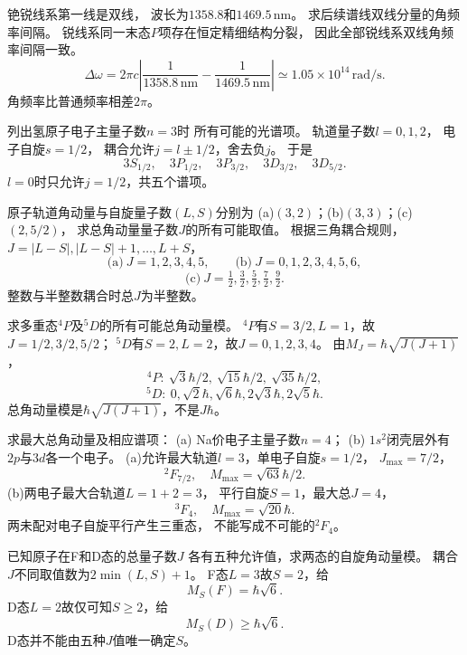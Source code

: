 铯锐线系第一线是双线，
波长为$1358.8$和$1469.5\,\mathrm{nm}$。
求后续谱线双线分量的角频率间隔。
\exsolution
锐线系同一末态$P$项存在恒定精细结构分裂，
因此全部锐线系双线角频率间隔一致。
\[
 \boxed{\Delta\omega=
 2\pi c\left|\frac1{1358.8\,\mathrm{nm}}
 -\frac1{1469.5\,\mathrm{nm}}\right|
 \simeq1.05\times10^{14}\,\mathrm{rad/s}}.
\]
\excheck 角频率比普通频率相差$2\pi$。

列出氢原子电子主量子数$n=3$时
所有可能的光谱项。
\exsolution
轨道量子数$l=0,1,2$，
电子自旋$s=1/2$，
耦合允许$j=l\pm1/2$，舍去负$j$。
于是
\[
 \boxed{3S_{1/2},\quad3P_{1/2},\quad3P_{3/2},\quad
 3D_{3/2},\quad3D_{5/2}}.
\]
\excheck $l=0$时只允许$j=1/2$，共五个谱项。

原子轨道角动量与自旋量子数$(L,S)$分别为
(a)$(3,2)$；(b)$(3,3)$；(c)$(2,5/2)$，
求总角动量量子数$J$的所有可能取值。
\exsolution
根据三角耦合规则，
$J=|L-S|,|L-S|+1,\ldots,L+S$，
\[
 \boxed{\text{(a)}\ J=1,2,3,4,5},
 \qquad
 \boxed{\text{(b)}\ J=0,1,2,3,4,5,6},
\]
\[
 \boxed{\text{(c)}\ J=\tfrac12,\tfrac32,\tfrac52,\tfrac72,\tfrac92}.
\]
\excheck 整数与半整数耦合时总$J$为半整数。

求多重态\({}^{4}P\)及\({}^{5}D\)的所有可能总角动量模。
\exsolution
\({}^{4}P\)有$S=3/2,L=1$，故$J=1/2,3/2,5/2$；
\({}^{5}D\)有$S=2,L=2$，故$J=0,1,2,3,4$。
由$M_J=\hbar\sqrt{J(J+1)}$，
\[
 \boxed{{}^{4}P:\ \sqrt3\hbar/2,\ \sqrt{15}\hbar/2,\ \sqrt{35}\hbar/2},
\]
\[
 \boxed{{}^{5}D:\ 0,\sqrt2\hbar,\sqrt6\hbar,2\sqrt3\hbar,2\sqrt5\hbar}.
\]
\excheck 总角动量模是$\hbar\sqrt{J(J+1)}$，不是$J\hbar$。

求最大总角动量及相应谱项：
(a) Na价电子主量子数$n=4$；
(b) $1s^2$闭壳层外有$2p$与$3d$各一个电子。
\exsolution
(a)允许最大轨道$l=3$，单电子自旋$s=1/2$，
$J_{\max}=7/2$，
\[
 \boxed{{}^{2}F_{7/2},\quad M_{\max}=\sqrt{63}\hbar/2}.
\]
(b)两电子最大合轨道$L=1+2=3$，
平行自旋$S=1$，最大总$J=4$，
\[
 \boxed{{}^{3}F_4,\quad M_{\max}=\sqrt{20}\hbar}.
\]
\excheck 两未配对电子自旋平行产生三重态，
不能写成不可能的\({}^{2}F_4\)。

已知原子在F和D态的总量子数$J$
各有五种允许值，求两态的自旋角动量模。
\exsolution
耦合$J$不同取值数为$2\min(L,S)+1$。
F态$L=3$故$S=2$，给
\[
 \boxed{M_S(F)=\hbar\sqrt6}.
\]
D态$L=2$故仅可知$S\ge2$，给
\[
 \boxed{M_S(D)\ge\hbar\sqrt6}.
\]
\excheck D态并不能由五种$J$值唯一确定$S$。


